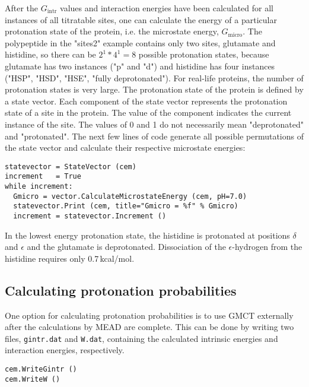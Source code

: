 \documentclass[a4paper,11pt]{article}
\begin{document}
{After the $G_{\mathrm{intr}}$ values and interaction energies have been calculated 
for all instances of all titratable sites, 
one can calculate the energy of a particular protonation state of the protein, i.e. 
the microstate energy, $G_{\mathrm{micro}}$.
%
The polypeptide in the "sites2" example contains only two sites, 
glutamate and histidine,
so there can be $2^1 * 4^1 = 8$ possible protonation states, because glutamate has two
instances ("p" and "d") and histidine has four instances ("HSP", "HSD", "HSE", "fully deprotonated").
%
For real-life proteins, the number of protonation states is very large.
%
The protonation state of the protein is defined by a state vector.
%
Each component of the state vector represents the protonation state of a site in the protein.
%
The value of the component indicates the current instance of the site.
%
The values of 0 and 1 do not necessarily mean "deprotonated" and "protonated".
%
The next few lines of code generate all possible permutations of the state vector and calculate
their respective microstate energies:

{\footnotesize \begin{lstlisting}
statevector = StateVector (cem)
increment   = True
while increment:
  Gmicro = vector.CalculateMicrostateEnergy (cem, pH=7.0)
  statevector.Print (cem, title="Gmicro = %f" % Gmicro)
  increment = statevector.Increment ()
\end{lstlisting} }

\bigskip
In the lowest energy protonation state, the histidine is protonated at 
positions $\delta$ and $\epsilon$ and the glutamate is deprotonated.
%
Dissociation of the $\epsilon$-hydrogen from the histidine requires only 0.7\,kcal/mol.


\subsection{Calculating protonation probabilities}
One option for calculating protonation probabilities is to use GMCT externally after 
the calculations by MEAD are complete.
%
This can be done by writing two files, \texttt{gintr.dat} and \texttt{W.dat}, containing 
the calculated intrinsic energies and interaction energies, respectively.

{\footnotesize \begin{lstlisting}
cem.WriteGintr ()
cem.WriteW ()
\end{lstlisting} }


}
\end{document}
